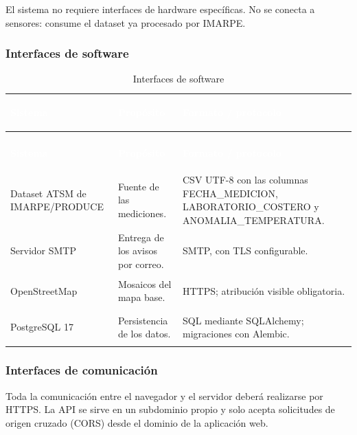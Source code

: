 \documentclass[11pt,a4paper,oneside]{article}
\begin{document}
El sistema no requiere interfaces de hardware específicas. No se conecta a sensores: consume el dataset ya procesado por IMARPE.



\subsubsection{Interfaces de software}

{\small
\begin{xltabular}{\textwidth}{@{}>{\sffamily\bfseries\raggedright\arraybackslash}p{4cm}YY@{}}
\caption{Interfaces de software}\label{tab:intsw}\\
\textcolor{white}{\sffamily\bfseries\footnotesize Sistema} & \textcolor{white}{\sffamily\bfseries\footnotesize Propósito} & \textcolor{white}{\sffamily\bfseries\footnotesize Formato / protocolo}\\
\endfirsthead
{}\\
\textcolor{white}{\sffamily\bfseries\footnotesize Sistema} & \textcolor{white}{\sffamily\bfseries\footnotesize Propósito} & \textcolor{white}{\sffamily\bfseries\footnotesize Formato / protocolo}\\
\endhead
Dataset ATSM de IMARPE/PRODUCE & Fuente de las mediciones. & CSV UTF-8 con las columnas FECHA\_MEDICION, LABORATORIO\_COSTERO y ANOMALIA\_TEMPERATURA.\\ \hline
{}Servidor SMTP & Entrega de los avisos por correo. & SMTP, con TLS configurable.\\ \hline
OpenStreetMap & Mosaicos del mapa base. & HTTPS; atribución visible obligatoria.\\ \hline
{}PostgreSQL 17 & Persistencia de los datos. & SQL mediante SQLAlchemy; migraciones con Alembic.\\ \hline
\end{xltabular}}
\vspace{0.6em}

\subsubsection{Interfaces de comunicación}

Toda la comunicación entre el navegador y el servidor deberá realizarse por HTTPS. La API se sirve en un subdominio propio y solo acepta solicitudes de origen cruzado (CORS) desde el dominio de la aplicación web.
\end{document}
